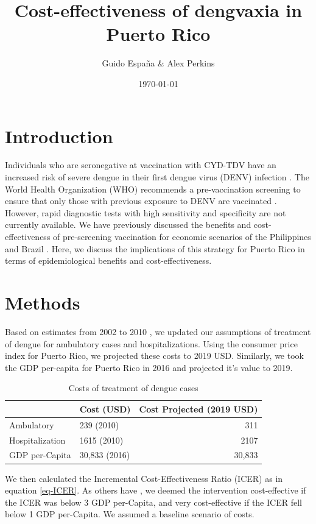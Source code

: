 \documentclass[11pt]{article}
\author{Guido España \& Alex Perkins}
\date{\today}
\title{Cost-effectiveness of dengvaxia in Puerto Rico}
\newcommand{\R}[1]{\label{#1}\linelabel{#1}}
\begin{document}
\maketitle
\linenumbers
\section{Introduction}
\label{sec:orgcd02ace}
Individuals who are seronegative at vaccination with CYD-TDV have an increased risk of severe dengue in their first dengue virus (DENV) infection \cite{Sridhar2018}. The World Health Organization (WHO) recommends a pre-vaccination screening to ensure that only those with previous exposure to DENV are vaccinated \cite{WHO2018}. However, rapid diagnostic tests with high sensitivity and specificity are not currently available. We have previously discussed the benefits and cost-effectiveness of pre-screening vaccination for economic scenarios of the Philippines and Brazil \cite{Espana2019Biorxiv}. Here, we discuss the implications of this strategy for Puerto Rico in terms of epidemiological benefits and cost-effectiveness.

\section{Methods}
\label{sec:orgec99251}
Based on estimates from 2002 to 2010 \cite{Halasa2012}, we updated our assumptions of treatment of dengue for ambulatory cases and hospitalizations. Using the consumer price index for Puerto Rico, we projected these costs to 2019 USD. Similarly, we took the GDP per-capita for Puerto Rico in 2016 \cite{worldbank2016} and projected it's value to 2019. 

\begin{table}[htbp]
\caption{\label{tbl-costs}
Costs of treatment of dengue cases}
\centering
\begin{tabular}{llr}
\hline
 & Cost (USD) & Cost Projected (2019 USD)\\
\hline
Ambulatory & 239 (2010) & 311\\
Hospitalization & 1615 (2010) & 2107\\
GDP per-Capita & 30,833 (2016) & 30,833\\
\hline
\end{tabular}
\end{table}

We then calculated the Incremental Cost-Effectiveness Ratio (ICER) as in equation \ref{eq-ICER}. \R{Rev1Com2} As others have \cite{shim2017,shim2017b,flasche2016}, we deemed the intervention cost-effective if the ICER was below 3 GDP per-Capita, and very cost-effective if the ICER fell below 1 GDP per-Capita. We assumed a baseline scenario of costs.
\end{document}
